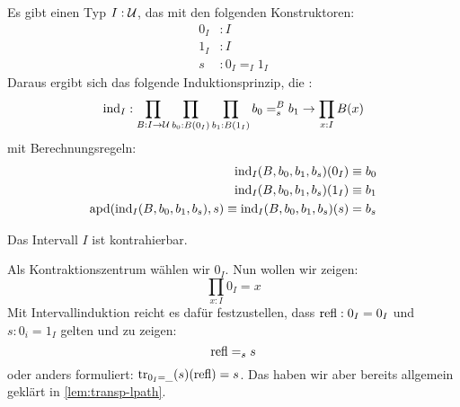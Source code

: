 \begin{regeln}
  Es gibt einen Typ $I:\mathcal{U}$, das  mit den folgenden Konstruktoren:
  \begin{align*}
    0_I&:I \\
    1_I&:I \\
    s&:0_I =_I 1_I
  \end{align*}
  Daraus ergibt sich das folgende Induktionsprinzip, die :
  \[
    \mathrm{ind}_{I}:\prod_{B:I\to\mathcal{U}}\prod_{b_0:B(0_I)}\prod_{b_1:B(1_I)}b_0 =_s^B b_1 \to\prod_{x:I}B(x) 
  \]
  mit Berechnungsregeln:
  \begin{align*}
    \mathrm{ind}_{I}(B,b_0,b_1,b_s)(0_I) &\equiv b_0 \\
    \mathrm{ind}_{I}(B,b_0,b_1,b_s)(1_I) &\equiv b_1 \\
    \mathrm{apd}(\mathrm{ind}_{I}(B,b_0,b_1,b_s),s)\equiv\mathrm{ind}_{I}(B,b_0,b_1,b_s)(s) &= b_s \\
  \end{align*}
\end{regeln}

\begin{bemerkung}
  Das Intervall $I$ ist kontrahierbar.
\end{bemerkung}
\begin{beweis}
  Als Kontraktionszentrum wählen wir $0_I$. Nun wollen wir zeigen:
  \[
    \prod_{x:I}0_I=x
  \]
  Mit Intervallinduktion reicht es dafür festzustellen, dass $\mathrm{refl}:0_I=0_I$ und $s:0_i=1_I$ gelten und zu zeigen:
  \[
    \mathrm{refl} =_s s
  \]
  oder anders formuliert: $\mathrm{tr}_{0_I=\_}(s)(\mathrm{refl})=s$. Das haben wir aber bereits allgemein geklärt in \cref{lem:transp-lpath}.
\end{beweis}

